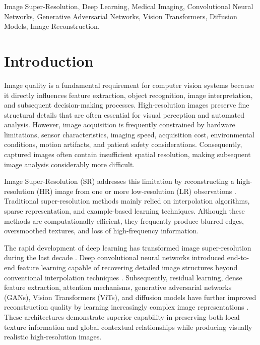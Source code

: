 \documentclass[conference]{IEEEtran}
\begin{document}
\begin{IEEEkeywords}
Image Super-Resolution, Deep Learning, Medical Imaging, Convolutional Neural Networks, Generative Adversarial Networks, Vision Transformers, Diffusion Models, Image Reconstruction.
\end{IEEEkeywords}

\section{Introduction}

Image quality is a fundamental requirement for computer vision systems because it directly influences feature extraction, object recognition, image interpretation, and subsequent decision-making processes. High-resolution images preserve fine structural details that are often essential for visual perception and automated analysis. However, image acquisition is frequently constrained by hardware limitations, sensor characteristics, imaging speed, acquisition cost, environmental conditions, motion artifacts, and patient safety considerations. Consequently, captured images often contain insufficient spatial resolution, making subsequent image analysis considerably more difficult.

Image Super-Resolution (SR) addresses this limitation by reconstructing a high-resolution (HR) image from one or more low-resolution (LR) observations \cite{anwar2020survey, chauhan2023review, li2024survey}. Traditional super-resolution methods mainly relied on interpolation algorithms, sparse representation, and example-based learning techniques. Although these methods are computationally efficient, they frequently produce blurred edges, oversmoothed textures, and loss of high-frequency information.

The rapid development of deep learning has transformed image super-resolution during the last decade \cite{zhang2025survey}. Deep convolutional neural networks introduced end-to-end feature learning capable of recovering detailed image structures beyond conventional interpolation techniques \cite{dong2015srcnn}. Subsequently, residual learning, dense feature extraction, attention mechanisms, generative adversarial networks (GANs), Vision Transformers (ViTs), and diffusion models have further improved reconstruction quality by learning increasingly complex image representations \cite{kim2016vdsr, lim2017edsr, ledig2017srgan, liang2021swinir, aala2026diffusion}. These architectures demonstrate superior capability in preserving both local texture information and global contextual relationships while producing visually realistic high-resolution images.
\end{document}
